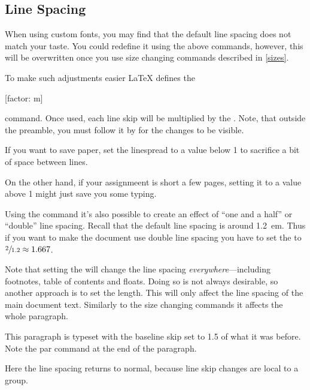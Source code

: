 \subsection{Line Spacing}

When using custom fonts, you may find that the default line spacing does not
match your taste. You could redefine it using the above 
commands, however, this will be overwritten once you use size changing commands
described in \autoref{sizes}.

To make such adjustments easier \LaTeX{} defines the
\begin{lscommand}
  [factor: m]
\end{lscommand}
command. Once used, each line skip will be multiplied by the .
Note, that outside the preamble, you must follow it by  for the
changes to be visible.
\begin{example}
\linespread{0.9}\selectfont
If you want to save paper, set
the linespread to a value
below 1 to sacrifice a bit of
space between lines.

\linespread{1.1}\selectfont
On the other hand, if your
assignmeent is short a few
pages, setting it to a value
above 1 might just save you
some typing.
\end{example}

Using the  command it's also possible to create an effect of
\enquote{one and a half} or \enquote{double} line spacing. Recall that the
default line spacing is around \qty{1.2}{em}. Thus if you want to make the
document use double line spacing you have to set the  to
\(\sfrac{2}{1.2} \approx 1.667\).

Note that setting the  will change the line spacing
\emph{everywhere}---including footnotes, table of contents and floats. Doing so
is not always desirable, so another approach is to set the 
length. This will only affect the line spacing of the main document text.
Similarly to the size changing commands it affects the whole paragraph.
\begin{example}
{\setlength{\baselineskip}{%
  1.5\baselineskip}
This paragraph is typeset with
the baseline skip set to 1.5 of
what it was before. Note the
par command at the end of the
paragraph.\par}

Here the line spacing returns
to normal, because line skip
changes are local to a group.
\end{example}

